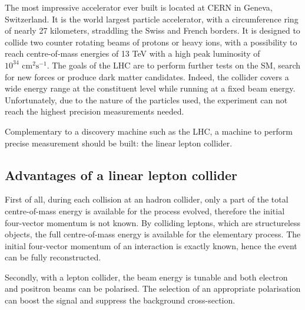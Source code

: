   The most impressive accelerator ever built is located at CERN in Geneva, Switzerland. 
  It is the world largest particle accelerator, with a circumference ring of nearly 27 kilometers, straddling the Swiss and French borders.
  It is designed to collide two counter rotating beams of protons or heavy ions, with a possibility to reach centre-of-mass energies of 13 TeV with a high peak luminosity of $10^{34} \text{ cm}^2 \text{s}^{-1}$.
  The goals of the \gls{LHC} are to perform further tests on the SM, search for new forces or produce dark matter candidates. 
  Indeed, the collider covers a wide energy range at the constituent level while running at a fixed beam energy.
  Unfortunately, due to the nature of the particles used, the experiment can not reach the highest precision measurements needed.
  
  Complementary to a discovery machine such as the \gls{LHC}, a machine to perform precise measurement should be built: the linear lepton collider.

    \subsection{Advantages of a linear lepton collider}
    \label{subsec:advLLC}
    
    First of all, during each collision at an hadron collider, only a part of the total centre-of-mass energy is available for the process evolved, therefore the initial four-vector momentum is not known. 
    By colliding leptons, which are structureless objects, the full centre-of-mass energy is available for the elementary process. 
    The initial four-vector momentum of an interaction is exactly known, hence the event can be fully reconstructed.

    Secondly, with a lepton collider, the beam energy is tunable and both electron and positron beams can be polarised. 
    The selection of an appropriate polarisation can boost the signal and suppress the background cross-section. 


